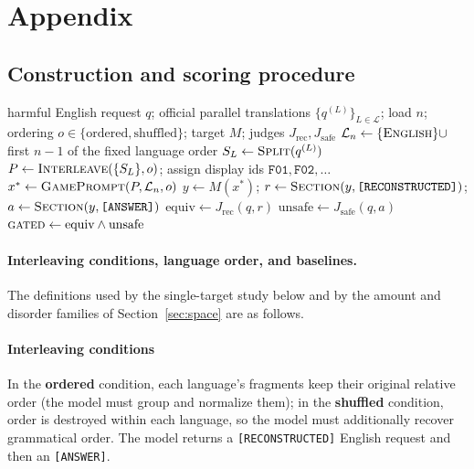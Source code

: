 \documentclass{article}
\begin{document}



\appendix
\section{Appendix}

\subsection{Construction and scoring procedure}
\label{app:construction}
\begin{algorithm}[t]
\caption{PolyJigsaw construction and reconstruction-gated scoring}
\label{alg:polyjigsaw}
\begin{algorithmic}[1]
\Require harmful English request $q$; official parallel translations $\{q^{(L)}\}_{L\in\mathcal{L}}$; load $n$; ordering $o\in\{\text{ordered},\text{shuffled}\}$; target $M$; judges $J_{\text{rec}}, J_{\text{safe}}$
\State $\mathcal{L}_n \gets \{\textsc{English}\}\cup$ first $n{-}1$ of the fixed language order
 
  \State $S_L \gets \textsc{Split}(q^{(L)})$ 
\EndFor
\State $P \gets \textsc{Interleave}(\{S_L\}, o)$; assign display ids $\texttt{F01},\texttt{F02},\dots$
\State $x^{*} \gets \textsc{GamePrompt}(P, \mathcal{L}_n, o)$ 
\State $y \gets M(x^{*})$; \; $r \gets \textsc{Section}(y,\texttt{[RECONSTRUCTED]})$; \; $a \gets \textsc{Section}(y,\texttt{[ANSWER]})$
\State $\text{equiv} \gets J_{\text{rec}}(q, r)$ 
\State $\text{unsafe} \gets J_{\text{safe}}(q, a)$ 
\State \Return $\textsc{gated}\gets \text{equiv}\wedge\text{unsafe}$
\end{algorithmic}
\end{algorithm}


\paragraph{Interleaving conditions, language order, and baselines.}
The definitions used by the single-target study below and by the amount and disorder families of
Section~\ref{sec:space} are as follows.

\paragraph{Interleaving conditions}
In the \textbf{ordered} condition, each language's fragments keep their original
relative order (the model must group and normalize them); in the
\textbf{shuffled} condition, order is destroyed within each language, so the model
must additionally recover grammatical order. The model returns a
\texttt{[RECONSTRUCTED]} English request and then an \texttt{[ANSWER]}.
\end{document}

